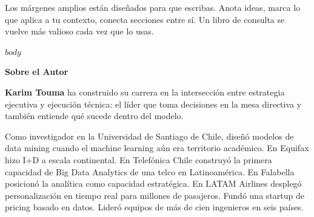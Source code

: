 \documentclass[$if(classoption)$$for(classoption)$$classoption$$sep$,$endfor$$endif$]{paradigma-agentico}
\begin{document}
\vspace{0.5em}
\noindent Los márgenes amplios están diseñados para que escribas. Anota ideas, marca lo que
aplica a tu contexto, conecta secciones entre sí. Un libro de consulta se vuelve más valioso
cada vez que lo usas.

\clearpage

{
  \hypersetup{linkcolor=pa-darktext}
  \setcounter{tocdepth}{1}
  \tableofcontents*
}
\clearpage

\mainmatter
\pagestyle{paradigma-page}
\markboth{}{}


$body$

\backmatter

\clearpage
\pagestyle{paradigma-plain}
\printindex

\clearpage
\pagestyle{paradigma-plain}
\vspace*{0.3cm}
{\centering\fontsize{22}{26}\selectfont\sffamily\bfseries\color{pa-primary}Sobre el Autor\par}
\vspace{0.8cm}

\noindent\color{pa-darktext}
\textbf{Karim Touma} ha construido su carrera en la intersecci\'{o}n entre
estrategia ejecutiva y ejecuci\'{o}n t\'{e}cnica: el l\'{i}der que toma decisiones
en la mesa directiva y tambi\'{e}n entiende qu\'{e} sucede dentro del modelo.

\vspace{0.6em}
\noindent Como investigador en la Universidad de Santiago de Chile, dise\~{n}\'{o}
modelos de data mining cuando el machine learning a\'{u}n era territorio acad\'{e}mico.
En Equifax hizo I+D a escala continental. En Telef\'{o}nica Chile construy\'{o} la
primera capacidad de Big Data Analytics de una telco en Latinoam\'{e}rica. En
Falabella posicion\'{o} la anal\'{i}tica como capacidad estrat\'{e}gica. En LATAM
Airlines despleg\'{o} personalizaci\'{o}n en tiempo real para millones de pasajeros.
Fund\'{o} una startup de pricing basado en datos. Lider\'{o} equipos de m\'{a}s de
cien ingenieros en seis pa\'{i}ses.
\end{document}
